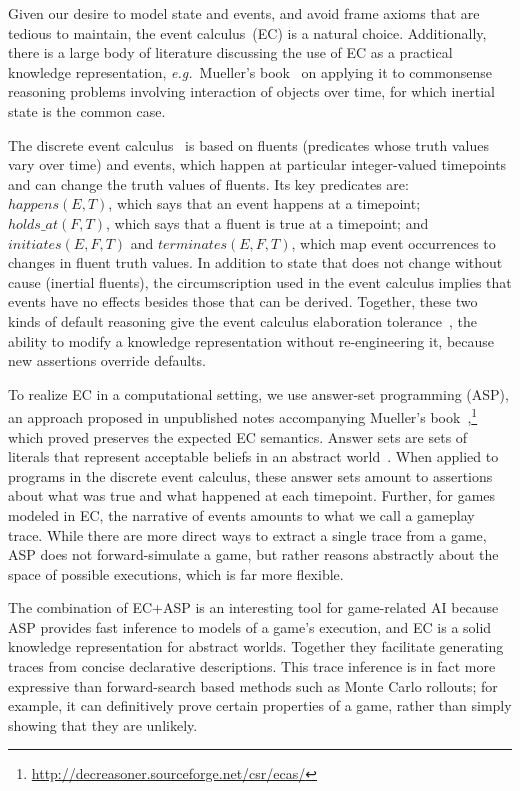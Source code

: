 \documentclass[conference]{IEEEtran}
\newcommand{\logical}[1]{$#1$}
\begin{document}
Given our desire to model state and events, and avoid frame axioms that are
tedious to maintain, the event calculus~(EC) is a natural choice.
Additionally, there is a large body of literature discussing the use of EC as a
practical knowledge representation, \emph{e.g.}\ Mueller's
book~\citep{Mueller:book} on applying it to commonsense reasoning problems
involving interaction of objects over time, for which inertial state is the
common case.

The discrete event calculus~\citep{DEC} is based on fluents (predicates
whose truth values vary over time) and events, which happen at particular
integer-valued timepoints and can change the truth values of fluents. Its key
predicates are: \logical{happens(E,T)}, which says that an event happens at a
timepoint; \logical{holds\_at(F,T)}, which says that a fluent is true at a
timepoint; and \logical{initiates(E,F,T)} and \logical{terminates(E,F,T)}, which
map event occurrences to changes in fluent truth values. In addition to state
that does not change without cause (inertial fluents), the circumscription used
in the event calculus implies that events have no effects besides those that
can be derived. Together, these two kinds of default reasoning give the event
calculus elaboration tolerance~\citep{McCarthy:elaboration}, the ability to
modify a knowledge representation without re-engineering it, because new
assertions override defaults.

To realize EC in a computational setting, we use answer-set programming (ASP),
an approach proposed in unpublished notes accompanying
Mueller's book~\citep{Mueller:book},\footnote{\url{http://decreasoner.sourceforge.net/csr/ecas/}} which
\citet{ECASP} proved preserves the expected EC semantics.  Answer sets are sets
of literals that represent acceptable beliefs in an abstract world~\citep{ASP}.
When applied to programs in the discrete event calculus, these answer sets
amount to assertions about what was true and what happened at each timepoint.
Further, for games modeled in EC, the narrative of events amounts to what we
call a gameplay trace. While there are more direct ways to extract a single
trace from a game, ASP does not forward-simulate a game, but rather reasons
abstractly about the space of possible executions, which is far more flexible.

The combination of EC+ASP is an interesting tool for game-related AI because
ASP provides fast inference to models of a game's execution, and EC is a solid
knowledge representation for abstract worlds. Together they facilitate
generating traces from concise declarative descriptions.  This trace inference
is in fact more expressive than forward-search based methods such as Monte
Carlo rollouts; for example, it can definitively prove certain properties of a
game, rather than simply showing that they are unlikely.
\end{document}
